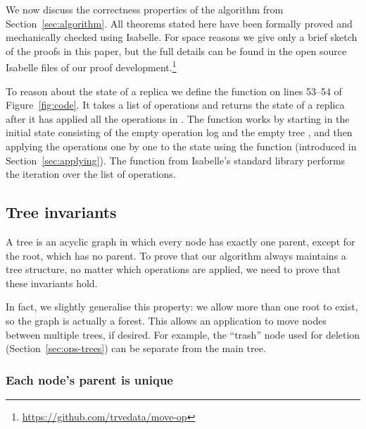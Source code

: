 \documentclass[sigconf]{acmart}
\begin{document}
We now discuss the correctness properties of the algorithm from Section~\ref{sec:algorithm}.
All theorems stated here have been formally proved and mechanically checked using Isabelle.
For space reasons we give only a brief sketch of the proofs in this paper, but the full details can be found in the open source Isabelle files of our proof development.\footnote{\url{https://github.com/trvedata/move-op}}

To reason about the state of a replica we define the function  on lines 53--54 of Figure~\ref{fig:code}.
It takes a list of operations  and returns the state of a replica after it has applied all the operations in .
The  function works by starting in the initial state \isa{([], \{\})} consisting of the empty operation log \isa{[]} and the empty tree \isa{\{\}}, and then applying the operations one by one to the state using the  function (introduced in Section~\ref{sec:applying}).
The  function from Isabelle's standard library performs the iteration over the list of operations.

\subsection{Tree invariants}\label{sec:tree-invariants}

A tree is an acyclic graph in which every node has exactly one parent, except for the root, which has no parent.
To prove that our algorithm always maintains a tree structure, no matter which operations are applied, we need to prove that these invariants hold.

In fact, we slightly generalise this property: we allow more than one root to exist, so the graph is actually a forest.
This allows an application to move nodes between multiple trees, if desired.
For example, the ``trash'' node used for deletion (Section~\ref{sec:ops-trees}) can be separate from the main tree.

\subsubsection{Each node's parent is unique}
\end{document}
